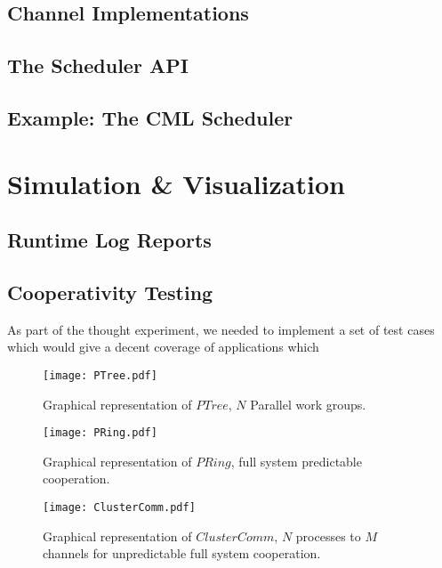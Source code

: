 \subsection{Channel Implementations}\label{sec:channel implementations}


\subsection{The Scheduler API}\label{sec:the scheduler api}
\subsection{Example: The CML Scheduler}\label{sec:example the cml scheduler}


\section{Simulation \& Visualization}\label{sec:simulation and visualization}

\subsection{Runtime Log Reports}\label{sec:runtime log reports}
\subsection{Cooperativity Testing}\label{sec:cooperativity testing}

As part of the thought experiment, we needed to implement a set of test cases 
which would give a decent coverage of applications which 

\begin{figure}
\centering
\texttt{[image: PTree.pdf]}
\caption{Graphical representation of $PTree$, $N$ Parallel work groups.}
\label{fig:PTree}
\end{figure}

\begin{figure}
\centering
\texttt{[image: PRing.pdf]}
\caption{Graphical representation of $PRing$, full system predictable 
cooperation.}
\label{fig:PRing}
\end{figure}

\begin{figure}
\centering
\texttt{[image: ClusterComm.pdf]}
\caption{Graphical representation of $ClusterComm$, $N$ processes to $M$ 
channels for unpredictable full system cooperation.}
\label{fig:ClusterComm}
\end{figure}

